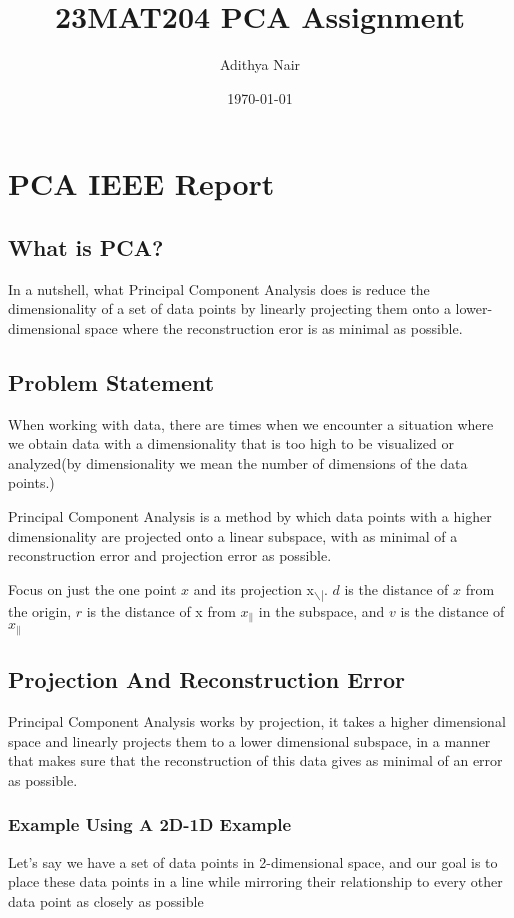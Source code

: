 \documentclass[11pt]{article}
\author{Adithya Nair}
\date{\today}
\title{23MAT204 PCA Assignment}
\begin{document}
\maketitle
\tableofcontents

\section{PCA IEEE Report}
\label{sec:orge69fc65}
\subsection{What is PCA?}
\label{sec:org864e941}
In a nutshell, what Principal Component Analysis does is reduce the dimensionality of a set of data points by linearly projecting them onto a lower-dimensional space where the reconstruction eror is as minimal as possible.
\subsection{Problem Statement}
\label{sec:orgb0e4dd2}
When working with data, there are times when we encounter a situation where we obtain data with a dimensionality that is too high to be visualized or analyzed(by dimensionality we mean the number of dimensions of the data points.)

Principal Component Analysis is a method by which data points with a higher dimensionality are projected onto a linear subspace, with as minimal of a reconstruction error and projection error as possible.

Focus on just the one point \(x\) and its projection x\textsubscript{$\backslash$|}. \(d\) is the distance of \(x\) from the origin, \(r\) is the distance of x from \(x_{\|}\) in the subspace, and \(v\) is the distance of \(x_{\|}\)
\subsection{Projection And Reconstruction Error}
\label{sec:org58f5f4c}
Principal Component Analysis works by projection, it takes a higher dimensional space and linearly projects them to a lower dimensional subspace, in a manner that makes sure that the reconstruction of this data gives as minimal of an error as possible.
\subsubsection{Example Using A 2D-1D Example}
\label{sec:orgac080fe}

Let's say we have a set of data points in 2-dimensional space, and our goal is to place these data points in a line while mirroring their relationship to every other data point as closely as possible
\end{document}
